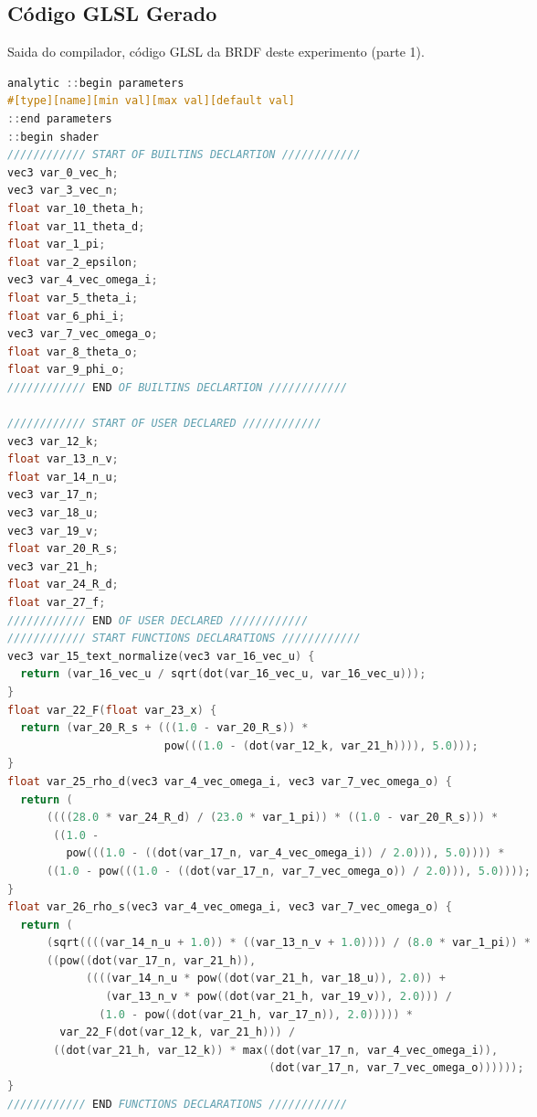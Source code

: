 \subsection{Código GLSL Gerado}
\begin{codigo}[H]
    \caption{\small Saida do compilador, código GLSL da BRDF deste experimento (parte 1). }
    \label{cod-ashikhmin-shirley-close-to-original-eqlang-declarations}
\begin{lstlisting}[language=C, inputencoding=utf8]
analytic ::begin parameters
#[type][name][min val][max val][default val]
::end parameters
::begin shader
//////////// START OF BUILTINS DECLARTION ////////////
vec3 var_0_vec_h;
vec3 var_3_vec_n;
float var_10_theta_h;
float var_11_theta_d;
float var_1_pi;
float var_2_epsilon;
vec3 var_4_vec_omega_i;
float var_5_theta_i;
float var_6_phi_i;
vec3 var_7_vec_omega_o;
float var_8_theta_o;
float var_9_phi_o;
//////////// END OF BUILTINS DECLARTION ////////////

//////////// START OF USER DECLARED ////////////
vec3 var_12_k;
float var_13_n_v;
float var_14_n_u;
vec3 var_17_n;
vec3 var_18_u;
vec3 var_19_v;
float var_20_R_s;
vec3 var_21_h;
float var_24_R_d;
float var_27_f;
//////////// END OF USER DECLARED ////////////
//////////// START FUNCTIONS DECLARATIONS ////////////
vec3 var_15_text_normalize(vec3 var_16_vec_u) {
  return (var_16_vec_u / sqrt(dot(var_16_vec_u, var_16_vec_u)));
}
float var_22_F(float var_23_x) {
  return (var_20_R_s + (((1.0 - var_20_R_s)) *
                        pow(((1.0 - (dot(var_12_k, var_21_h)))), 5.0)));
}
float var_25_rho_d(vec3 var_4_vec_omega_i, vec3 var_7_vec_omega_o) {
  return (
      ((((28.0 * var_24_R_d) / (23.0 * var_1_pi)) * ((1.0 - var_20_R_s))) *
       ((1.0 -
         pow(((1.0 - ((dot(var_17_n, var_4_vec_omega_i)) / 2.0))), 5.0)))) *
      ((1.0 - pow(((1.0 - ((dot(var_17_n, var_7_vec_omega_o)) / 2.0))), 5.0))));
}
float var_26_rho_s(vec3 var_4_vec_omega_i, vec3 var_7_vec_omega_o) {
  return (
      (sqrt((((var_14_n_u + 1.0)) * ((var_13_n_v + 1.0)))) / (8.0 * var_1_pi)) *
      ((pow((dot(var_17_n, var_21_h)),
            ((((var_14_n_u * pow((dot(var_21_h, var_18_u)), 2.0)) +
               (var_13_n_v * pow((dot(var_21_h, var_19_v)), 2.0))) /
              (1.0 - pow((dot(var_21_h, var_17_n)), 2.0))))) *
        var_22_F(dot(var_12_k, var_21_h))) /
       ((dot(var_21_h, var_12_k)) * max((dot(var_17_n, var_4_vec_omega_i)),
                                        (dot(var_17_n, var_7_vec_omega_o))))));
}
//////////// END FUNCTIONS DECLARATIONS ////////////
\end{lstlisting}
\end{codigo}

